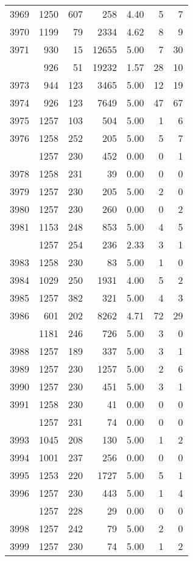 \documentclass[
]{article}
\begin{document}
\begin{table}
\begin{tabular}[t]{lrrrrrr}
3969 & 1250 & 607 & 258 & 4.40 & 5 & 7\\
3970 & 1199 & 79 & 2334 & 4.62 & 8 & 9\\
3971 & 930 & 15 & 12655 & 5.00 & 7 & 30\\
\addlinespace
3972 & 926 & 51 & 19232 & 1.57 & 28 & 10\\
3973 & 944 & 123 & 3465 & 5.00 & 12 & 19\\
3974 & 926 & 123 & 7649 & 5.00 & 47 & 67\\
3975 & 1257 & 103 & 504 & 5.00 & 1 & 6\\
3976 & 1258 & 252 & 205 & 5.00 & 5 & 7\\
\addlinespace
3977 & 1257 & 230 & 452 & 0.00 & 0 & 1\\
3978 & 1258 & 231 & 39 & 0.00 & 0 & 0\\
3979 & 1257 & 230 & 205 & 5.00 & 2 & 0\\
3980 & 1257 & 230 & 260 & 0.00 & 0 & 2\\
3981 & 1153 & 248 & 853 & 5.00 & 4 & 5\\
\addlinespace
3982 & 1257 & 254 & 236 & 2.33 & 3 & 1\\
3983 & 1258 & 230 & 83 & 5.00 & 1 & 0\\
3984 & 1029 & 250 & 1931 & 4.00 & 5 & 2\\
3985 & 1257 & 382 & 321 & 5.00 & 4 & 3\\
3986 & 601 & 202 & 8262 & 4.71 & 72 & 29\\
\addlinespace
3987 & 1181 & 246 & 726 & 5.00 & 3 & 0\\
3988 & 1257 & 189 & 337 & 5.00 & 3 & 1\\
3989 & 1257 & 230 & 1257 & 5.00 & 2 & 6\\
3990 & 1257 & 230 & 451 & 5.00 & 3 & 1\\
3991 & 1258 & 230 & 41 & 0.00 & 0 & 0\\
\addlinespace
3992 & 1257 & 231 & 74 & 0.00 & 0 & 0\\
3993 & 1045 & 208 & 130 & 5.00 & 1 & 2\\
3994 & 1001 & 237 & 256 & 0.00 & 0 & 0\\
3995 & 1253 & 220 & 1727 & 5.00 & 5 & 1\\
3996 & 1257 & 230 & 443 & 5.00 & 1 & 4\\
\addlinespace
3997 & 1257 & 228 & 29 & 0.00 & 0 & 0\\
3998 & 1257 & 242 & 79 & 5.00 & 2 & 0\\
3999 & 1257 & 230 & 74 & 5.00 & 1 & 2\\

\end{tabular}
\end{table}
\end{document}
